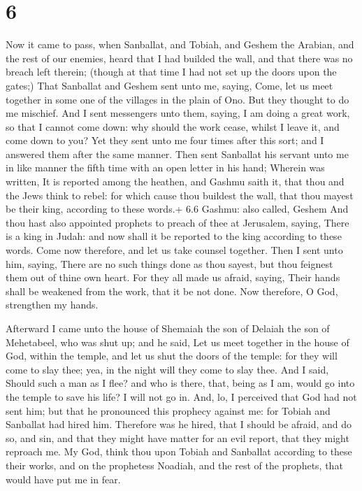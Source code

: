 \hypertarget{section-5}{%
\section{6}\label{section-5}}

 Now it came to pass, when Sanballat, and Tobiah, and Geshem
the Arabian, and the rest of our enemies, heard that I had builded the
wall, and that there was no breach left therein; (though at that time I
had not set up the doors upon the gates;)  That Sanballat
and Geshem sent unto me, saying, Come, let us meet together in some one
of the villages in the plain of Ono. But they thought to do me mischief.
 And I sent messengers unto them, saying, I am doing a great
work, so that I cannot come down: why should the work cease, whilst I
leave it, and come down to you?  Yet they sent unto me four
times after this sort; and I answered them after the same manner.
 Then sent Sanballat his servant unto me in like manner the
fifth time with an open letter in his hand;  Wherein was
written, It is reported among the heathen, and Gashmu saith it, that
thou and the Jews think to rebel: for which cause thou buildest the
wall, that thou mayest be their king, according to these words.+ 6.6
Gashmu: also called, Geshem  And thou hast also appointed
prophets to preach of thee at Jerusalem, saying, There is a king in
Judah: and now shall it be reported to the king according to these
words. Come now therefore, and let us take counsel together.
 Then I sent unto him, saying, There are no such things done
as thou sayest, but thou feignest them out of thine own heart.
 For they all made us afraid, saying, Their hands shall be
weakened from the work, that it be not done. Now therefore, O God,
strengthen my hands.

 Afterward I came unto the house of Shemaiah the son of
Delaiah the son of Mehetabeel, who was shut up; and he said, Let us meet
together in the house of God, within the temple, and let us shut the
doors of the temple: for they will come to slay thee; yea, in the night
will they come to slay thee.  And I said, Should such a man
as I flee? and who is there, that, being as I am, would go into the
temple to save his life? I will not go in.  And, lo, I
perceived that God had not sent him; but that he pronounced this
prophecy against me: for Tobiah and Sanballat had hired him.
 Therefore was he hired, that I should be afraid, and do
so, and sin, and that they might have matter for an evil report, that
they might reproach me.  My God, think thou upon Tobiah and
Sanballat according to these their works, and on the prophetess Noadiah,
and the rest of the prophets, that would have put me in fear.

